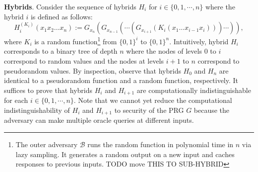 \noindent \textbf{Hybrids}. Consider the sequence of hybrids $H_i$ for $i \in \{ 0, 1, \cdots, n\}$ where the hybrid $i$ is defined as follows:
\[H_{i}^{(K_i)} (x_1x_2\ldots x_n ):= G_{x_n}(G_{x_{n-1}} (\cdots(G_{x_{i+1}}(K_i(x_1\dots x_{i-1}x_i))) \cdots  )), \]
where $K_i$ is a random function\footnote{The outer adversary $\mathcal{B}$ runs the random function in polynomial time in $n$ via lazy sampling. It generates a random output on a new input and caches responses to previous inputs. TODO move THIS TO SUB-HYBRID} from $\{0,1\}^{i}$ to $\{0,1\}^n$. Intuitively, hybrid $H_i$ corresponds to a binary tree of depth $n$ where the nodes of levels $0$ to $i$ correspond to random values and the nodes at levels $i+1$ to $n$ correspond to pseudorandom values. By inspection, observe that hybrids $H_0$ and $H_n$ are identical to a pseudorandom function and a random function, respectively. It suffices to prove that hybrids $H_i$ and $H_{i+1}$ are computationally indistinguishable for each $i \in \{ 0, 1, \cdots, n\}$. Note that we cannot yet reduce the computational indistinguishability of $H_i$ and $H_{i+1}$ to security of the PRG $G$ because the adversary can make multiple oracle queries at different inputs.\smallskip

